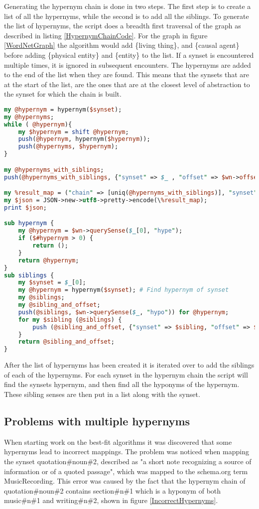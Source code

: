 Generating the hypernym chain is done in two steps.
The first step is to create a list of all the hypernyms,
while the second is to add all the siblings.
To generate the list of hypernyms, the script does a breadth first traversal of the graph as described in listing \ref{HypernymChainCode}.
For the graph in figure \ref{WordNetGraph} the algorithm would add \{living thing\},
and \{causal agent\} before adding \{physical entity\} and \{entity\} to the list.
If a synset is encountered multiple times, it is ignored in subsequent encounters.
The hypernyms are added to the end of the list when they are found.
This means that the synsets that are at the start of the list,
are the ones that are at the closest level of abstraction to the synset for which the chain is built.

\begin{lstlisting}[float=t, language=perl, label=HypernymChainCode, caption={Excerpt from the hypernym chain Perl script}]
my @hypernym = hypernym($synset);
my @hypernyms;
while ( @hypernym){
	my $hypernym = shift @hypernym;
	push(@hypernym, hypernym($hypernym));
	push(@hypernyms, $hypernym);
}

my @hypernyms_with_siblings;
push(@hypernyms_with_siblings, {"synset" => $_ , "offset" => $wn->offset($_) ,"siblings" => [siblings($_)]}) for @hypernyms;

my %result_map = ("chain" => [uniq(@hypernyms_with_siblings)], "synset" => $synset, "offset"=> $wn->offset($synset), "siblings" => [siblings($synset)]);
my $json = JSON->new->utf8->pretty->encode(\%result_map);
print $json;

sub hypernym {
	my @hypernym = $wn->querySense($_[0], "hype");
	if ($#hypernym > 0) {
		return ();
	}
	return @hypernym;
}
sub siblings {
	my $synset = $_[0];
	my @hypernym = hypernym($synset); # Find hypernym of synset
	my @siblings;
	my @sibling_and_offset;
	push(@siblings, $wn->querySense($_, "hypo")) for @hypernym;
	for my $sibling (@siblings) {
		push (@sibling_and_offset, {"synset" => $sibling, "offset" => $wn->offset($sibling)});
	}
	return @sibling_and_offset;
}
\end{lstlisting}


After the list of hypernyms has been created it is iterated over to add the siblings of each of the hypernyms.
For each synset in the hypernym chain the script will find the synsets hypernym,
and then find all the hyponyms of the hypernym.
These sibling senses are then put in a list along with the synset.

\subsection{Problems with multiple hypernyms}
When starting work on the best-fit algorithms it was discovered that some hypernyms lead to incorrect mappings.
The problem was noticed when mapping the synset quotation\#noun\#2,
described as "a short note recognizing a source of information or of a quoted passage",
which was mapped to the schema.org term MusicRecording.
This error was caused by the fact that the hypernym chain of quotation\#noun\#2 contains
section\#n\#1 which is a hyponym of both music\#n\#1 and writing\#n\#2, shown in figure \ref{IncorrectHypernyms}.

